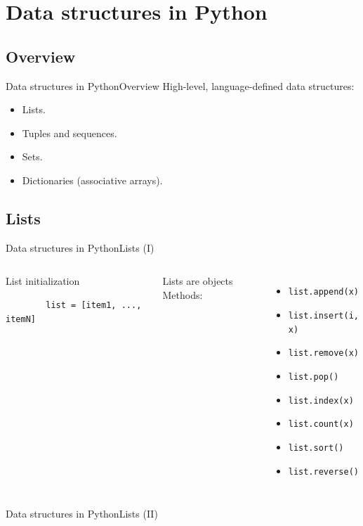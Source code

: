 \documentclass[10pt,compress]{beamer} %
\begin{document}
\section{Data structures in Python}
\subsection{Overview}
\begin{frame}{Data structures in Python}{Overview}
	High-level, language-defined data structures:
	\begin{itemize}
		\item Lists.
		\item Tuples and sequences.
		\item Sets.
		\item Dictionaries (associative arrays).
	\end{itemize}
\end{frame}

\subsection{Lists}
\begin{frame}[fragile]{Data structures in Python}{Lists (I)}
    \begin{columns}
	   \begin{block}{List initialization}
	   	\begin{verbatim}
		list = [item1, ..., itemN]
		\end{verbatim}
	   \end{block}
	   Lists are objects
	Methods:
	\begin{itemize}
		\item \texttt{list.append(x)}
		\item \texttt{list.insert(i, x)}
		\item \texttt{list.remove(x)}
		\item \texttt{list.pop()}
		\item \texttt{list.index(x)}
		\item \texttt{list.count(x)}
		\item \texttt{list.sort()}
		\item \texttt{list.reverse()}
	\end{itemize}
   \end{columns}
\end{frame}

\begin{frame}[shrink]{Data structures in Python}{Lists (II)}
\scriptsize{
		\begin{block}{}
		\vspace{-0.4cm}
		
		\vspace{-0.2cm}
		\end{block}
		}
\end{frame}
\end{document}
